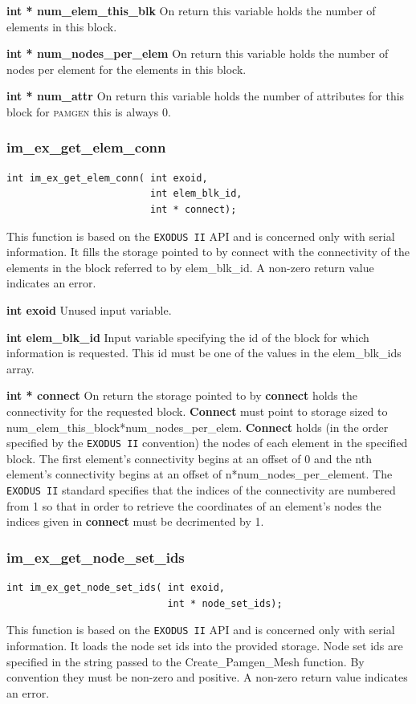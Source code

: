 {\setlength{\parindent}{0pt}
 \textbf{int * num\_elem\_this\_blk}  On return this variable holds the number of elements in this block. }

{\setlength{\parindent}{0pt}
 \textbf{int * num\_nodes\_per\_elem}  On return this variable holds the number of nodes per element for the elements in this block. }

{\setlength{\parindent}{0pt}
 \textbf{int * num\_attr}  On return this variable holds the number of attributes for this block for \textsc{pamgen} this is always 0. }

\subsubsection{im\_ex\_get\_elem\_conn}
{\ttfamily  \begin{verbatim}
int im_ex_get_elem_conn( int exoid,
                         int elem_blk_id,
                         int * connect);
\end{verbatim}}
This function is based on the \texttt{EXODUS II} API and is concerned only with serial information. It fills the storage pointed to by connect with the connectivity of the elements in the block referred to by elem\_blk\_id. A non-zero return value indicates an error.

{\setlength{\parindent}{0pt}
 \textbf{int exoid} Unused input variable.}

{\setlength{\parindent}{0pt}
 \textbf{int elem\_blk\_id}  Input variable specifying the id of the block for which information is requested. This id must be one of the values in the elem\_blk\_ids array.}

{\setlength{\parindent}{0pt}
 \textbf{int * connect}  On return the storage pointed to by \textbf{connect} holds the connectivity for the requested block. \textbf{Connect} must point to storage sized to num\_elem\_this\_block*num\_nodes\_per\_elem. \textbf{Connect} holds (in the order specified by the \texttt{EXODUS II} convention) the nodes of each element in the specified block. The first element's connectivity begins at an offset of 0 and the nth element's connectivity begins at an offset of n*num\_nodes\_per\_element. The \texttt{EXODUS II} standard specifies that the indices of the connectivity are numbered  from 1 so that in order to retrieve the coordinates of an element's nodes the indices given in \textbf{connect} must be decrimented by 1.}

\subsubsection{im\_ex\_get\_node\_set\_ids}
{\ttfamily  \begin{verbatim}
int im_ex_get_node_set_ids( int exoid,
                            int * node_set_ids);
\end{verbatim}}
This function is based on the \texttt{EXODUS II} API and is concerned only with serial information. It loads the node set ids into the provided storage. Node set ids are specified in the string passed to the Create\_Pamgen\_Mesh function. By convention they must be non-zero and positive. A non-zero return value indicates an error.

